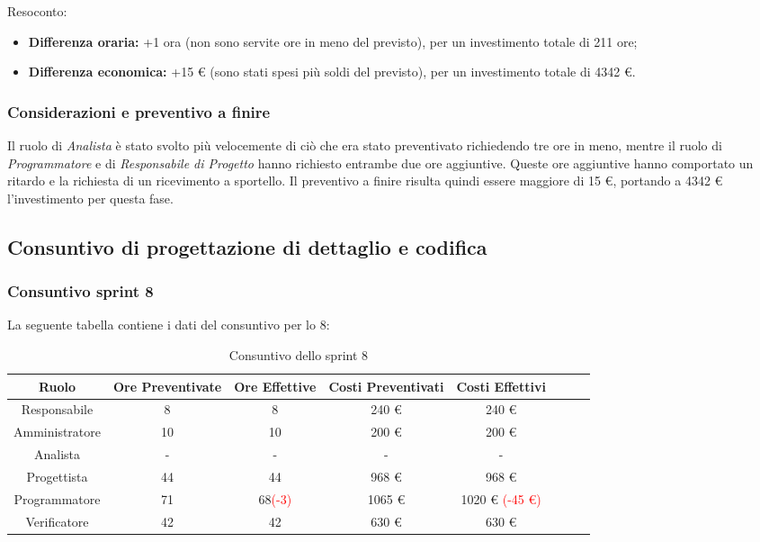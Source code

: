 Resoconto:
\begin{itemize}
	\item \textbf{Differenza oraria:} +1 ora (non sono servite ore in meno del previsto), per un investimento totale di 211 ore;
	\item \textbf{Differenza economica:} +15 \euro{} (sono stati spesi più soldi del previsto), per un investimento totale di 4342 \euro{}.
\end{itemize}
	


\subsubsection{Considerazioni e preventivo a finire}
Il ruolo di \textit{Analista} è stato svolto più velocemente di ciò che era stato preventivato richiedendo tre ore in meno, mentre il ruolo di \textit{Programmatore} e di \textit{Responsabile di Progetto} hanno richiesto entrambe due ore aggiuntive. Queste ore aggiuntive hanno comportato un ritardo e la richiesta di un ricevimento a sportello.\newline{}
Il preventivo a finire risulta quindi essere maggiore di 15 \euro{}, portando a 4342 \euro{} l'investimento per questa fase.

\subsection{Consuntivo di progettazione di dettaglio e codifica}

\subsubsection{Consuntivo sprint 8}

La seguente tabella contiene i dati del consuntivo per lo  8:
\begin{table}[H]
		\begin{center}
			\setlength{\aboverulesep}{0pt}
			\setlength{\belowrulesep}{0pt}
			\setlength{\extrarowheight}{.75ex}
			\begin{tabular}{ c c c c c c c c }
				\rowcolor{AzzurroGruppo!30} 
				\textbf{Ruolo} & \textbf{Ore Preventivate} & \textbf{Ore Effettive} & \textbf{Costi Preventivati} & \textbf{Costi Effettivi}\\
				\toprule
				Responsabile   & 8 & 8 & 240 \euro{}  & 240 \euro{}\\
				Amministratore & 10 & 10 & 200 \euro{}  & 200 \euro{} \\
				Analista       & - & - & -  & - \\
				Progettista    & 44 & 44 & 968 \euro{} & 968 \euro{} \\
				Programmatore  & 71 & 68\textcolor{red}{(-3)} & 1065 \euro{}  & 1020 \euro{} \textcolor{red}{(-45 \euro{})} \\
				Verificatore   & 42 & 42 & 630 \euro{}  & 630 \euro{} \\
				\bottomrule
			\end{tabular}
			\caption{Consuntivo dello sprint 8}
		\end{center}
	\end{table}
	
